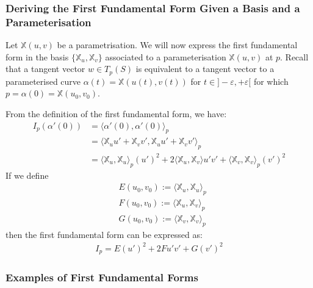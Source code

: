 \documentclass[11pt]{scrartcl}
\theoremstyle{definition}
\theoremstyle{remark}
\begin{document}
{\subsubsection{Deriving the First Fundamental Form Given a Basis and a Parameterisation}

Let $\mathbb{X}(u,v)$ be a parametrisation. We will now express the first fundamental form in the basis $\{ \mathbb{X}_u, \mathbb{X}_v \}$ associated to a parameterisation $\mathbb{X}(u,v)$ at $p$. Recall that a tangent vector $w \in T_p(S)$ is equivalent to a tangent vector to a parameterised curve $\alpha(t) = \mathbb{X}(u(t), v(t) ) $ for $t \in ]-\varepsilon, + \varepsilon[$ for which $p = \alpha(0) = \mathbb{X}(u_0, v_0)$. 

From the definition of the first fundamental form, we have:
\begin{align*}
	 I_p(\alpha'(0)) & = \langle \alpha'(0), \alpha'(0) \rangle_p \\
	 				 & = \langle \mathbb{X}_u u' + \mathbb{X}_v v', \mathbb{X}_u u' + \mathbb{X}_v v' \rangle_p \\
	 				 & = \langle \mathbb{X}_u, \mathbb{X}_u \rangle_p (u')^2 + 2 \langle \mathbb{X}_u, \mathbb{X}_v \rangle u' v' + \langle \mathbb{X}_v, \mathbb{X}_v \rangle_p (v')^2
\end{align*}
If we define 
\begin{align*}
	& E(u_0, v_0) := \langle \mathbb{X}_u, \mathbb{X}_u \rangle_p  \\
	& F(u_0, v_0) := \langle \mathbb{X}_u, \mathbb{X}_v \rangle_p  \\
	& G(u_0, v_0) := \langle \mathbb{X}_v, \mathbb{X}_v \rangle_p 
\end{align*}
then the first fundamental form can be expressed as: 
\begin{align*}
	I_p = E (u')^2 + 2 F u' v' + G(v')^2
\end{align*}

\subsubsection{Examples of First Fundamental Forms}

}
\end{document}
